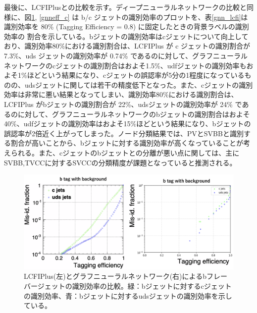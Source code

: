 最後に、LCFIPlusとの比較を示す。ディープニューラルネットワークの比較と同様に、図\ref{gnneff_b}, \ref{gnneff_c} は b/c ジェットの識別効率のプロットを、表\ref{gnn_lcfi}は識別効率を 80\% (Tagging Efficiency = 0.8) に固定したときの背景ラベルの識別効率の 割合を示している。bジェットの識別効率はcジェットについて向上しており、識別効率80\%における識別割合は、LCFIPlus が c ジェットの識別割合が 7.3\%、uds ジェットの識別効率が 0.74\% であるのに対して、グラフニューラルネットワークのcジェットの識別割合はおよそ1.5\%、udfジェットの識別効率もおよそ1\%ほどという結果になり、cジェットの誤認率が5分の1程度になっているものの、udsジェットに関しては若干の精度低下となった。また、cジェットの識別効率は非常に悪い結果となってしまい、識別効率80\%における識別割合は、LCFIPlus がbジェットの識別割合が 22\%、udsジェットの識別効率が 24\% であるのに対して、グラフニューラルネットワークのbジェットの識別割合はおよそ40\%、udfジェットの識別効率はおよそ15\%ほどという結果になり、bジェットの誤認率が2倍近く上がってしまった。ノード分類結果では、PVとSVBBと識別する割合が高いことから、bジェットに対する識別効率が高くなっていることが考えられる。また、cジェットのbジェットとの分離が悪い点に関しては、主にSVBB,TVCCに対するSVCCの分類精度が課題となっていると推測される。\\
\begin{figure}[H]
	\begin{center}
 \includegraphics[keepaspectratio, scale=0.3]
 	{Figure/Flavortagging/gnneff_b.png}
 		\caption{LCFIPlus(左)とグラフニューラルネットワーク(右)によるbフレーバージェットの識別効率の比較。緑：bジェットに対するcジェットの識別効率、青：bジェットに対するudsジェットの識別効率を示している。}
 		\label{gnneff_b}
	\end{center}
\end{figure}

